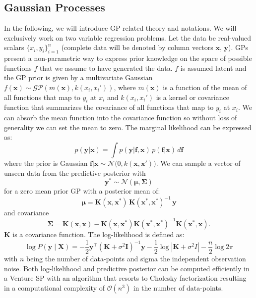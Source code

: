 \documentclass{article} %
\begin{document}
\subsection{Gaussian Processes}
In the following, we will introduce GP related theory and notations. We will exclusively work on two variable regression problems. Let the data be real-valued scalars  $\{x_i,y_i\}_{i=1}^n$ (complete data will be denoted by column vectors $\mathbf{x}$, $\mathbf{y}$). GPs present a non-parametric way to express prior knowledge on the space of possible functions  $f$ that we assume to have generated the data.  $f$ is assumed latent and the GP prior is given by a multivariate Gaussian $f(\mathbf{x})\sim \mathcal{GP}(m(\mathbf{x}),k(x_i,x_i'))$, where $m(\mathbf{x})$ is a function of the mean of all functions that map to $y_i$ at $x_i$ and $k(x_i,x_i')$ is a kernel or covariance function that summarizes the covariance of all functions that map to $y_i$ at $x_i$. We can absorb the mean function into the covariance function so without loss of generality we can set the mean to zero. The marginal likelihood can be expressed as:
\begin{equation}
\label{eq:marg}
p(\mathbf{y}|\mathbf{x}) = \int p(\mathbf{y}|\mathbf{f,x})\, p(\mathbf{f}|\mathbf{x}) \, d\mathbf{f} 
\end{equation}
where the prior is Gaussian $\mathbf{f}|\mathbf{x} \sim \mathcal{N}\big(0,k(\mathbf{x},\mathbf{x}')\big)$. We can sample a vector of unseen data from the predictive posterior with
\begin{equation}
\label{eq:gpsampler}
\mathbf{y}^* \sim \mathcal{N}(\bm{\mu},\bm{\Sigma}) 
\end{equation}
for a zero mean prior GP with a posterior mean of:
\begin{equation}
\label{eq:conditonalGaussianMean}
\bm{\mu} = \mathbf{K}(\mathbf{x},\mathbf{x}^*)\,\mathbf{K}(\mathbf{x}^*,\mathbf{x}^*)^{-1}\,\mathbf{y}
\end{equation}
and covariance
\begin{equation}
\label{eq:conditonalGaussianCovariance}
\bm{\Sigma} =  \mathbf{K}(\mathbf{x},\mathbf{x}) - \mathbf{K}(\mathbf{x},\mathbf{x}^*)\mathbf{K}(\mathbf{x}^*,\mathbf{x}^*)^{-1} \mathbf{K}(\mathbf{x}^*,\mathbf{x}).
\end{equation}
$\mathbf{K}$ is a covariance function. The log-likelihood is defined as:
\begin{equation}
\log P(\mathbf{y} \mid \mathbf{X})  = -\frac{1}{2}\mathbf{y}^\top (\mathbf{K} + \sigma^2\mathbf{I})^{-1}\mathbf{y} -  \frac{1}{2}\log |\mathbf{K} + \sigma^2I| -  \frac{n}{2}\log 2 \pi
\end{equation}
with $n$ being the number of data-points and sigma the independent observation noise.
Both log-likelihood and predictive posterior can be computed efficiently in a Venture SP with an algorithm that resorts to Cholesky factorization\citep[chap. 2]{rasmussen2006gaussian} resulting in a computational complexity of $\mathcal{O}(n^3)$ in the number of data-points.
\end{document}
